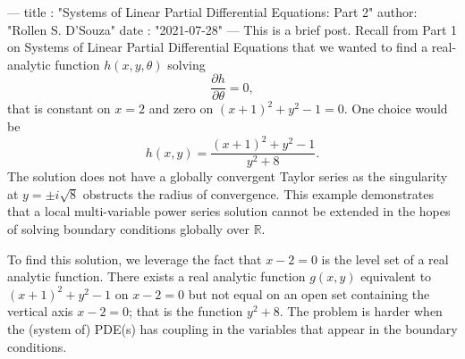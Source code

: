---
title :   "Systems of Linear Partial Differential Equations: Part 2"
author:   "Rollen S. D'Souza"
date  :   "2021-07-28"
---
This is a brief post.
Recall from Part 1 on Systems of Linear Partial Differential Equations that we wanted to find a real-analytic function \(h(x, y, \theta)\) solving
\[
  \frac{\partial h}{\partial \theta} = 0,
\]
that is constant on \(x = 2\) and zero on \((x+1)^2 + y^2 - 1 = 0.\)
One choice would be
\[
  h(x, y) = \frac{(x + 1)^2 + y^2 - 1}{y^2 + 8}.
\]
The solution does not have a globally convergent Taylor series as the singularity at \(y = \pm i\sqrt{8}\) obstructs the radius of convergence.
This example demonstrates that a local multi-variable power series solution cannot be extended in the hopes of solving boundary conditions globally over \(\mathbb{R}.\)

To find this solution, we leverage the fact that \(x - 2 = 0\) is the level set of a real analytic function.
There exists a real analytic function \(g(x,y)\) equivalent to \((x+1)^2 + y^2 - 1\) on \(x - 2 = 0\) but not equal on an open set containing the vertical axis \(x - 2 = 0\); that is the function \(y^2 + 8.\)
The problem is harder when the (system of) PDE(s) has coupling in the variables that appear in the boundary conditions.
